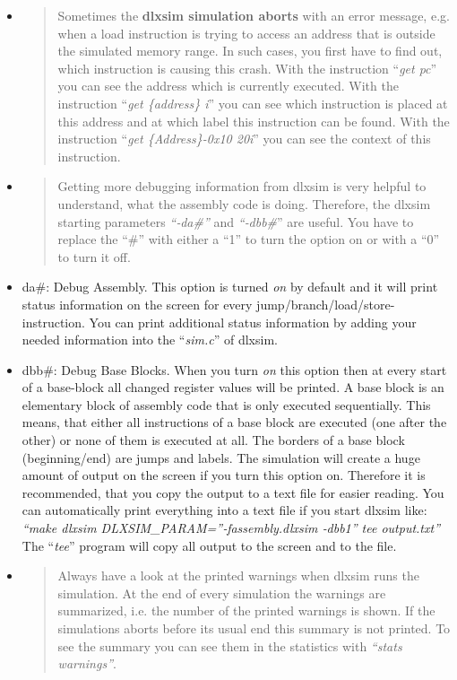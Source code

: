\documentclass[
]{article}
\begin{document}
\begin{itemize}
\item
  \begin{quote}
  Sometimes the \textbf{dlxsim simulation aborts} with an error message,
  e.g. when a load instruction is trying to access an address that is
  outside the simulated memory range. In such cases, you first have to
  find out, which instruction is causing this crash. With the
  instruction ``\emph{get pc}'' you can see the address which is
  currently executed. With the instruction ``\emph{get \{address\} i}''
  you can see which instruction is placed at this address and at which
  label this instruction can be found. With the instruction ``\emph{get
  \{Address\}-0x10 20i}'' you can see the context of this instruction.
  \end{quote}
\item
  \begin{quote}
  Getting more debugging information from dlxsim is very helpful to
  understand, what the assembly code is doing. Therefore, the dlxsim
  starting parameters \emph{``‑da\#''} and \emph{``‑dbb\#}'' are useful.
  You have to replace the ``\#'' with either a ``1'' to turn the option
  on or with a ``0'' to turn it off.
  \end{quote}
\item
  da\#: Debug Assembly. This option is turned \emph{on} by default and
  it will print status information on the screen for every
  jump/branch/load/store-instruction. You can print additional status
  information by adding your needed information into the
  ``\emph{sim.c}'' of dlxsim.
\item
  dbb\#: Debug Base Blocks. When you turn \emph{on} this option then at
  every start of a base-block all changed register values will be
  printed. A base block is an elementary block of assembly code that is
  only executed sequentially. This means, that either all instructions
  of a base block are executed (one after the other) or none of them is
  executed at all. The borders of a base block (beginning/end) are jumps
  and labels. The simulation will create a huge amount of output on the
  screen if you turn this option on. Therefore it is recommended, that
  you copy the output to a text file for easier reading. You can
  automatically print everything into a text file if you start dlxsim
  like:\\
  \emph{``make dlxsim DLXSIM\_PARAM=''‑fassembly.dlxsim ‑dbb1''
  \textbar{} tee output.txt''}\\
  The ``\emph{tee}'' program will copy all output to the screen and to
  the file.
\item
  \begin{quote}
  Always have a look at the printed warnings when dlxsim runs the
  simulation. At the end of every simulation the warnings are
  summarized, i.e. the number of the printed warnings is shown. If the
  simulations aborts before its usual end this summary is not printed.
  To see the summary you can see them in the statistics with
  \emph{``stats warnings''}.
  \end{quote}
\end{itemize}
\end{document}
